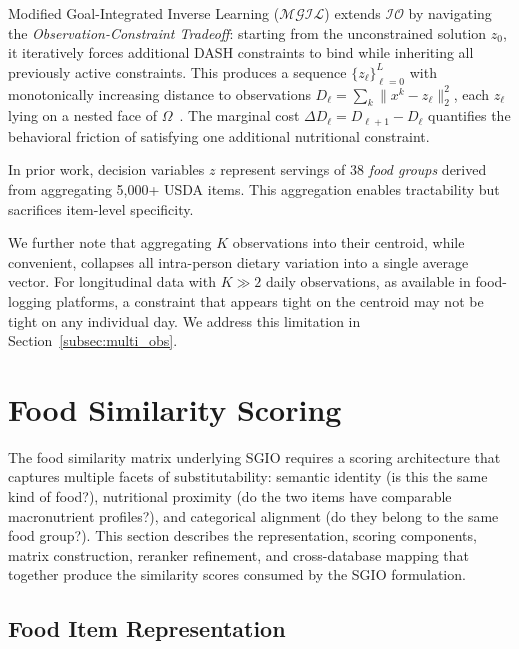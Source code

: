 \documentclass[journal]{IEEEtran}
\newcommand{\IO}{\mathcal{IO}}
\newcommand{\MGIL}{\mathcal{MGIL}}
\begin{document}
Modified Goal-Integrated Inverse Learning ($\MGIL$) extends $\IO$ by
navigating the \emph{Observation-Constraint Tradeoff}: starting from the
unconstrained solution $z_0$, it iteratively forces additional DASH
constraints to bind while inheriting all previously active constraints.
This produces a sequence $\{z_\ell\}_{\ell=0}^L$ with monotonically
increasing distance to observations $D_\ell = \sum_k\|x^k-z_\ell\|_2^2$,
each $z_\ell$ lying on a nested face of $\Omega$~\cite{ahmadi2024IL}.
The marginal cost $\Delta D_\ell = D_{\ell+1} - D_\ell$ quantifies
the behavioral friction of satisfying one additional nutritional
constraint.

In prior work, decision variables $z$ represent servings of 38
\emph{food groups} derived from aggregating 5,000+ USDA items. This
aggregation enables tractability but sacrifices item-level specificity.

We further note that aggregating $K$ observations into their centroid,
while convenient, collapses all intra-person dietary variation into a
single average vector. For longitudinal data with $K \gg 2$ daily
observations, as available in food-logging platforms, a constraint that
appears tight on the centroid may not be tight on any individual day.
We address this limitation in Section~\ref{subsec:multi_obs}.

\section{Food Similarity Scoring}
\label{sec:similarity}

The food similarity matrix underlying SGIO requires a scoring
architecture that captures multiple facets of substitutability:
semantic identity (is this the same kind of food?), nutritional
proximity (do the two items have comparable macronutrient profiles?),
and categorical alignment (do they belong to the same food group?).
This section describes the representation, scoring components, matrix
construction, reranker refinement, and cross-database mapping
that together produce the similarity scores consumed by the SGIO
formulation.

\subsection{Food Item Representation}
\label{subsec:representation}
\end{document}
